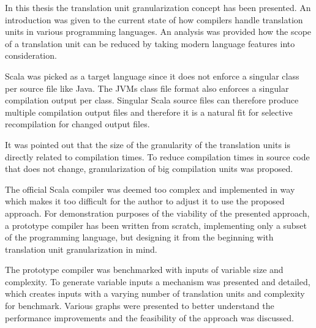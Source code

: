 \documentclass{VUMIFPSbakalaurinis}
\begin{document}

In this thesis the translation unit granularization concept has been presented.
An introduction was given to the current state of how compilers handle translation units in various programming languages.
An analysis was provided how the scope of a translation unit can be reduced by taking modern language features into consideration.

Scala was picked as a target language since it does not enforce a singular class per source file like Java.
The JVMs class file format also enforces a singular compilation output per class.
Singular Scala source files can therefore produce multiple compilation output files and therefore it is a natural fit for selective recompilation for changed output files.

It was pointed out that the size of the granularity of the translation units is directly related to compilation times.
To reduce compilation times in source code that does not change, granularization of big compilation units was proposed.

The official Scala compiler was deemed too complex and implemented in way which makes it too difficult for the author to adjust it to use the proposed approach.
For demonstration purposes of the viability of the presented approach, a prototype compiler has been written from scratch, implementing only a subset of the programming language, but designing it from the beginning with translation unit granularization in mind.

The prototype compiler was benchmarked with inputs of variable size and complexity.
To generate variable inputs a mechanism was presented and detailed, which creates inputs with a varying number of translation units and complexity for benchmark.
Various graphs were presented to better understand the performance improvements and the feasibility of the approach was discussed.

\end{document}
